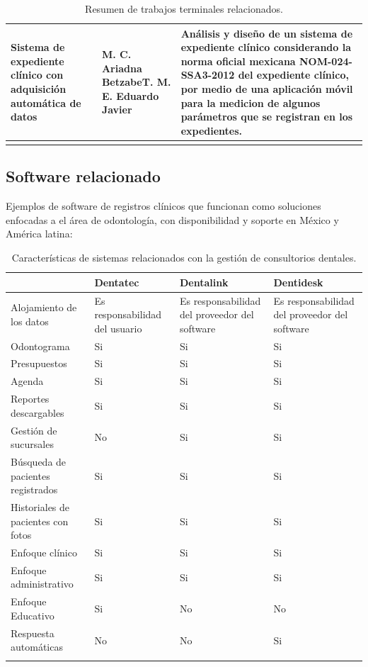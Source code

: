 \begin{longtable}{|p{4cm}|p{5cm}|p{7.5cm}|}
Sistema de expediente clínico con adquisición automática de datos
& M. C. Ariadna Betzabe\newline T. M. E. Eduardo Javier
& Análisis y diseño de un sistema de expediente clínico considerando la norma oficial mexicana NOM-024-SSA3-2012 del expediente clínico, por medio de una aplicación móvil para la medicion de algunos parámetros que se registran en los expedientes.\\\hline
\caption{Resumen de trabajos terminales relacionados.}
\label{table:1}
\end{longtable}

\newpage
\subsection{Software relacionado}

Ejemplos de software de registros clínicos que funcionan como soluciones enfocadas a el área de odontología, con disponibilidad y soporte en México y América latina:

\setlength\LTleft{0cm}
\begin{longtable}[H]{|p{}|C{0.20\textwidth}|C{0.20\textwidth}|C{0.20\textwidth}|}
\hline & Dentatec         & Dentalink         & Dentidesk         \\ 
\hline
Alojamiento de los datos           & Es responsabilidad del usuario & Es responsabilidad del proveedor del software & Es responsabilidad del proveedor del software 
\\ \hline 
Odontograma          & Si & Si  & Si  
\\ \hline
Presupuestos         & Si & Si  & Si  
\\ \hline
Agenda & Si & Si  & Si  
\\ \hline
Reportes descargables& Si & Si  & Si  
\\ \hline
Gestión de sucursales             & No & Si  & Si  
\\ \hline
Búsqueda de pacientes registrados & Si & Si  & Si  
\\ \hline
Historiales de pacientes con fotos & Si & Si  & Si  
\\ \hline
Enfoque clínico     & Si & Si  & Si  
\\ \hline
Enfoque administrativo             & Si & Si  & Si  
\\ \hline
Enfoque Educativo    & Si & No  & No  
\\ \hline
Respuesta automáticas             & No & No  & Si  
\\ \hline
\caption{Características de sistemas relacionados con la gestión de consultorios dentales.} \label{table:1} 
\end{longtable}


